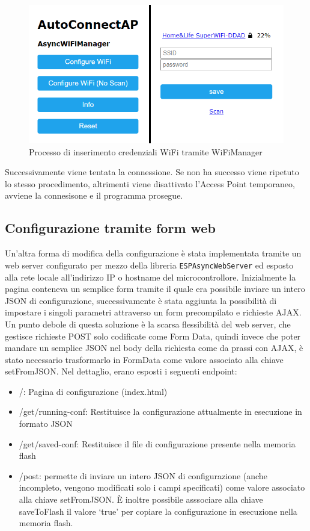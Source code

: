 \documentclass[12pt,a4paper]{report}
\begin{document}
\begin{figure}[h]
  \centering
  \includegraphics[width=\textwidth]{autoconnectap}
  \caption{Processo di inserimento credenziali WiFi tramite WiFiManager}
  \label{fig:autoconnectap}
\end{figure}

Successivamente viene tentata la connessione. Se non ha successo viene ripetuto lo stesso procedimento, altrimenti viene disattivato
l'Access Point temporaneo, avviene la connesisone e il programma prosegue.

\subsection{Configurazione tramite form web}
Un'altra forma di modifica della configurazione è stata implementata tramite un web server configurato per mezzo della libreria
\texttt{ESPAsyncWebServer} ed esposto alla rete locale all'indirizzo IP o hostname del microcontrollore.
 Inizialmente la pagina conteneva un semplice form tramite il quale era possibile inviare un intero JSON
di configurazione, successivamente è stata aggiunta la possibilità di impostare i singoli parametri attraverso un form precompilato
e richieste AJAX. Un punto debole di questa soluzione è la scarsa flessibilità del web server, che gestisce richieste POST solo codificate
come Form Data, quindi invece che poter mandare un semplice JSON nel body della richiesta come da prassi con AJAX, è stato necessario
trasformarlo in FormData come valore associato alla chiave setFromJSON.
Nel dettaglio, erano esposti i seguenti endpoint:
\begin{itemize}
  \item /: Pagina di configurazione (index.html)
  \item /get/running-conf: Restituisce la configurazione attualmente in esecuzione in formato JSON
  \item /get/saved-conf: Restituisce il file di configurazione presente nella memoria flash
  \item /post: permette di inviare un intero JSON di configurazione (anche incompleto, vengono modificati solo i campi specificati) come
        valore associato alla chiave setFromJSON. È inoltre possibile asssociare alla chiave saveToFlash il valore `true' per copiare
        la configurazione in esecuzione nella memoria flash.
\end{itemize}
\end{document}
